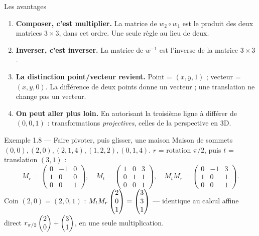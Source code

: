 \begin{frame}{Les avantages}
  \begin{enumerate}
    \item \textbf{Composer, c'est multiplier.} La matrice de
      $w_2\circ w_1$ est le produit des deux matrices $3\times3$, dans
      cet ordre. Une seule règle au lieu de deux.
    \item \textbf{Inverser, c'est inverser.} La matrice de $w^{-1}$ est
      l'inverse de la matrice $3\times3$.
    \item \textbf{La distinction point/vecteur revient.} Point =
      $(x,y,1)$ ; vecteur = $(x,y,0)$. La différence de deux points
      donne un vecteur ; une translation ne change pas un vecteur.
    \item \textbf{On peut aller plus loin.} En autorisant la troisième
      ligne à différer de $(0,0,1)$ : transformations
      \emph{projectives}, celles de la perspective en 3D.
  \end{enumerate}
\end{frame}

\begin{frame}{Exemple 1.8 --- Faire pivoter, puis glisser, une maison}
  \small Maison de sommets $(0,0),(2,0),(2,1{,}4),(1,2{,}2),(0,1{,}4)$.
  $r$ = rotation $\pi/2$, puis $t$ = translation $(3,1)$ :
  \[
    M_r = \begin{pmatrix} 0&-1&0\\ 1&0&0\\ 0&0&1\end{pmatrix},\quad
    M_t = \begin{pmatrix} 1&0&3\\ 0&1&1\\ 0&0&1\end{pmatrix},\quad
    M_tM_r = \begin{pmatrix} 0&-1&3\\ 1&0&1\\ 0&0&1\end{pmatrix}.
  \]
  Coin $(2,0) = (2,0,1)$ : $M_tM_r\begin{pmatrix}2\\ 0\\ 1\end{pmatrix} = \begin{pmatrix}3\\ 3\\ 1\end{pmatrix}$ ---
  identique au calcul affine direct
  $r_{\pi/2}\begin{pmatrix}2\\ 0\end{pmatrix}+\begin{pmatrix}3\\ 1\end{pmatrix}$, en une seule multiplication.
\end{frame}

